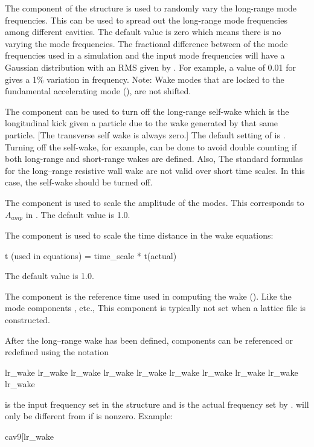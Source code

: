 The  component of the  structure is used to randomly vary the long-range
mode frequencies. This can be used to spread out the long-range mode frequencies among different
cavities. The default value is zero which means there is no varying the mode frequencies. The
fractional difference between of the mode frequencies used in a simulation and the input mode
frequencies will have a Gaussian distribution with an RMS given by . For example, a
value of 0.01 for  gives a 1\% variation in frequency. Note: Wake modes that are
locked to the fundamental accelerating mode (), are not shifted.

The  component can be used to turn off the long-range self-wake
which is the longitudinal kick given a particle due to the wake generated by that same
particle. [The transverse self wake is always zero.] The default setting of  is
. Turning off the self-wake, for example, can be done to avoid double counting if both
long-range and short-range wakes are defined. Also, The standard formulas for the long--range
resistive wall wake are not valid over short time scales. In this case, the self-wake should be
turned off.

The  component is used to scale the amplitude of the modes. This corresponds to $A_{amp}$
in . The default value is 1.0.

The  component  is used to scale the time distance in the wake equations:
\begin{example}
  t (used in equations) = time_scale * t(actual)
\end{example}
The default value is 1.0.

The  component is the reference time used in computing the wake (). Like the mode
components , etc., This component is typically not set when a lattice file is
constructed.

After the long--range wake has been defined, components can be referenced or redefined using the notation
\begin{example}
  lr_wake%
  lr_wake%
  lr_wake%
  lr_wake%
  lr_wake%
  lr_wake%
  lr_wake%
  lr_wake%
  lr_wake%
  lr_wake%
\end{example}
 is the input frequency set in the  structure and  is the actual
frequency set by \bmad.  will only be different from  if  is
nonzero. Example:
\begin{example}
  cav9[lr_wake%
\end{example}


